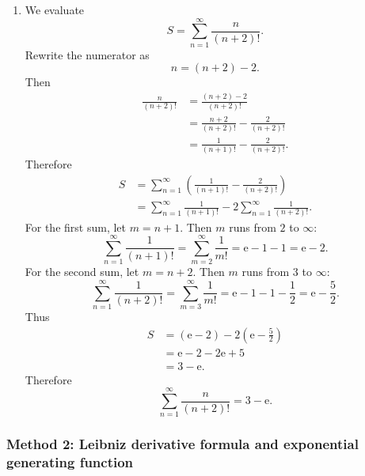 \documentclass[12pt]{article}
\newcommand{\ee}{\mathrm{e}}
\begin{document}
\begin{enumerate}[label=(\alph*)]
\item We evaluate
\[
S=\sum_{n=1}^{\infty}\frac{n}{(n+2)!}.
\]
Rewrite the numerator as
\[
n=(n+2)-2.
\]
Then
\begin{align*}
\frac{n}{(n+2)!}
&=\frac{(n+2)-2}{(n+2)!}\\
&=\frac{n+2}{(n+2)!}-\frac{2}{(n+2)!}\\
&=\frac{1}{(n+1)!}-\frac{2}{(n+2)!}.
\end{align*}
Therefore
\begin{align*}
S
&=
\sum_{n=1}^{\infty}\left(\frac{1}{(n+1)!}-\frac{2}{(n+2)!}\right)\\
&=
\sum_{n=1}^{\infty}\frac{1}{(n+1)!}
-
2\sum_{n=1}^{\infty}\frac{1}{(n+2)!}.
\end{align*}
For the first sum, let $m=n+1$. Then $m$ runs from $2$ to $\infty$:
\[
\sum_{n=1}^{\infty}\frac{1}{(n+1)!}
=
\sum_{m=2}^{\infty}\frac{1}{m!}
=
\ee-1-1
=
\ee-2.
\]
For the second sum, let $m=n+2$. Then $m$ runs from $3$ to $\infty$:
\[
\sum_{n=1}^{\infty}\frac{1}{(n+2)!}
=
\sum_{m=3}^{\infty}\frac{1}{m!}
=
\ee-1-1-\frac12
=
\ee-\frac52.
\]
Thus
\begin{align*}
S
&=(\ee-2)-2\left(\ee-\frac52\right)\\
&=\ee-2-2\ee+5\\
&=3-\ee.
\end{align*}
Therefore
\[
\boxed{\sum_{n=1}^{\infty}\frac{n}{(n+2)!}=3-\ee.}
\]
\end{enumerate}

\newpage
\subsubsection{Method 2: Leibniz derivative formula and exponential generating function}
\end{document}
